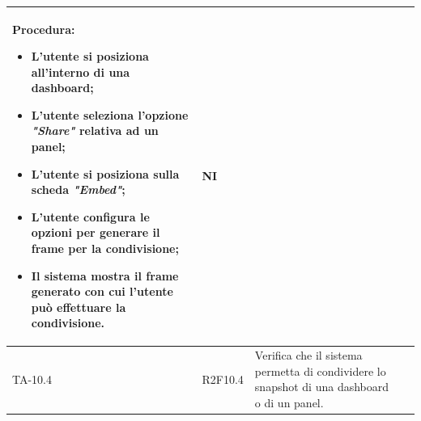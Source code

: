 \begin{longtable}{|C{2.5cm}|C{2.5cm}|L{6.5cm}|C{1.5cm}|}
	\textbf{Procedura}:
	\begin{itemize}		
		\item L'utente si posiziona all'interno di una dashboard;
		\item L'utente seleziona l'opzione \emph{"Share"} relativa ad un panel;
		\item L'utente si posiziona sulla scheda \emph{"Embed"};
		\item L'utente configura le opzioni per generare il frame per la condivisione;
		\item Il sistema mostra il frame generato con cui l'utente può effettuare la condivisione.
	\end{itemize}
	 & {NI}\\
	\hline
	{TA-10.4} & {R2F10.4} & 
	Verifica che il sistema permetta di condividere lo snapshot di una dashboard o di un
	panel.


\end{longtable}
